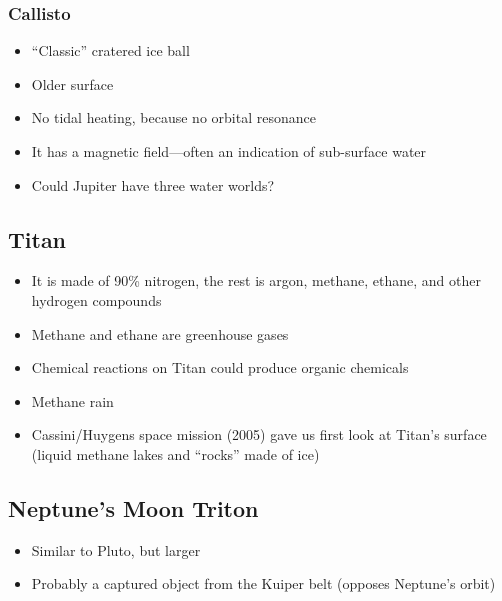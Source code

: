 \documentclass[class=article, crop=false]{standalone}
\begin{document}
  \subsubsection{Callisto}
  \begin{itemize}
    \item ``Classic'' cratered ice ball
    \item Older surface
    \item No tidal heating, because no orbital resonance
    \item It has a magnetic field---often an indication of sub-surface water
    \item Could Jupiter have three water worlds?
  \end{itemize}
  \subsection{Titan}
  \begin{itemize}
    \item It is made of 90\% nitrogen, the rest is argon, methane, ethane, and other hydrogen compounds
    \item Methane and ethane are greenhouse gases
    \item Chemical reactions on Titan could produce organic chemicals
    \item Methane rain
    \item Cassini/Huygens space mission (2005) gave us first look at Titan's surface (liquid methane lakes and ``rocks'' made of ice)
  \end{itemize}
  \subsection{Neptune's Moon Triton}
  \begin{itemize}
    \item Similar to Pluto, but larger
    \item Probably a captured object from the Kuiper belt (opposes Neptune's orbit)
  \end{itemize}
\end{document}
